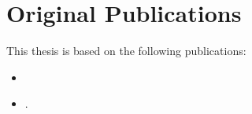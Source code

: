 \chapter*{Original Publications}

This thesis is based on the following publications:
{
\renewcommand*{\mkbibnamefamily}[1]{\textsc{#1}}
\renewcommand*{\mkbibnameprefix}[1]{\textsc{#1}}
\begin{itemize}
	\item {}
	\item {}.
\end{itemize}
}